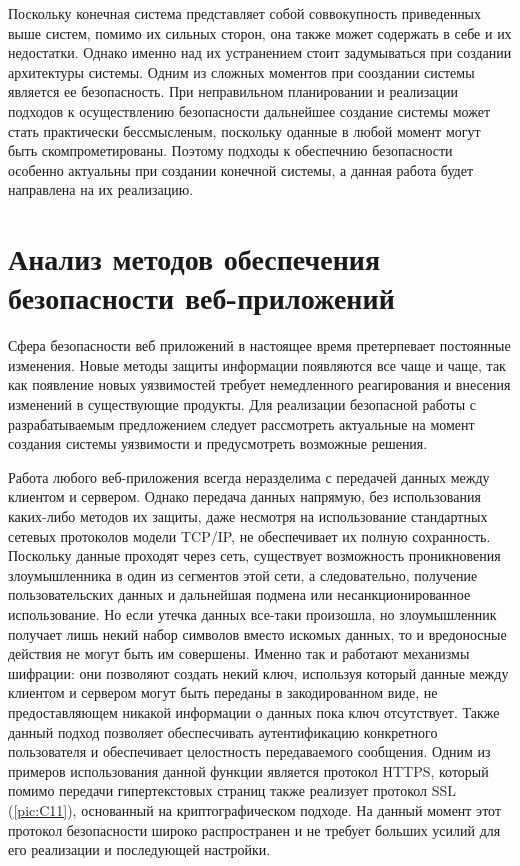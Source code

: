 Поскольку конечная система представляет собой соввокупность приведенных выше систем, помимо их сильных сторон, она также может содержать в себе и их недостатки. Однако именно над их устранением стоит задумываться при создании архитектуры системы. Одним из сложных моментов при сооздании системы является ее безопасность. При неправильном планировании и реализации подходов к осуществлению безопасности дальнейшее создание системы может стать практически бессмысленым, поскольку оданные в любой момент могут быть скомпрометированы. Поэтому подходы к обеспечнию безопасности особенно актуальны при создании конечной системы, а данная работа будет направлена на их реализацию. 

\section{Анализ методов обеспечения безопасности веб-приложений}

Сфера безопасности веб приложений в настоящее время претерпевает постоянные изменения. Новые методы защиты информации появляются все чаще и чаще, так как появление новых уязвимостей требует немедленного реагирования и внесения изменений в существующие продукты. Для реализации безопасной работы с разрабатываемым предложением следует рассмотреть актуальные на момент создания системы уязвимости и предусмотреть возможные решения.

Работа любого веб-приложения всегда неразделима с передачей данных между клиентом и сервером. Однако передача данных напрямую, без использования каких-либо методов их защиты, даже несмотря на использование стандартных сетевых протоколов модели TCP/IP, не обеспечивает их полную сохранность. Поскольку данные проходят через сеть, существует возможность проникновения злоумышленника в один из сегментов этой сети, а следовательно, получение пользовательских данных и дальнейшая подмена или несанкционированное использование. Но если утечка данных все-таки произошла, но злоумышленник получает лишь некий набор символов вместо искомых данных, то и вредоносные действия не могут быть им совершены. Именно так и работают механизмы шифрации: они позволяют создать некий ключ, используя который данные между клиентом и сервером могут быть переданы в закодированном виде, не предоставляющем никакой информации о данных пока ключ отсутствует. Также данный подход позволяет обеспесчивать аутентификацию конкретного пользователя и обеспечивает целостность передаваемого сообщения. Одним из примеров использования данной функции является протокол HTTPS, который помимо передачи гипертекстовых страниц также реализует протокол SSL (\ref{pic:C11}), основанный на криптографическом подходе. На данный момент этот протокол безопасности широко распространен и не требует больших усилий для его реализации и последующей настройки.

